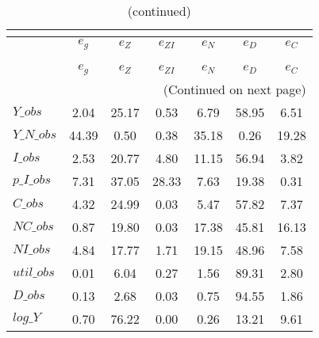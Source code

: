  
\begin{center}
\begin{longtable}{lcccccc} 
\caption{VARIANCE DECOMPOSITION (in percent)}\\
 \label{Table:th_var_decomp_uncond}\\
\toprule 
$           $	 & 	 $       {e_g}$	 & 	 $       {e_Z}$	 & 	 $    {e_{ZI}}$	 & 	 $       {e_N}$	 & 	 $       {e_D}$	 & 	 $       {e_C}$\\
\midrule \endfirsthead 
\caption{(continued)}\\
 \toprule \\ 
$           $	 & 	 $       {e_g}$	 & 	 $       {e_Z}$	 & 	 $    {e_{ZI}}$	 & 	 $       {e_N}$	 & 	 $       {e_D}$	 & 	 $       {e_C}$\\
\midrule \endhead 
\midrule \multicolumn{7}{r}{(Continued on next page)} \\ \bottomrule \endfoot 
\bottomrule \endlastfoot 
$Y\_obs     $	 & 	        2.04	 & 	       25.17	 & 	        0.53	 & 	        6.79	 & 	       58.95	 & 	        6.51 \\ 
$Y\_N\_obs  $	 & 	       44.39	 & 	        0.50	 & 	        0.38	 & 	       35.18	 & 	        0.26	 & 	       19.28 \\ 
$I\_obs     $	 & 	        2.53	 & 	       20.77	 & 	        4.80	 & 	       11.15	 & 	       56.94	 & 	        3.82 \\ 
$p\_I\_obs  $	 & 	        7.31	 & 	       37.05	 & 	       28.33	 & 	        7.63	 & 	       19.38	 & 	        0.31 \\ 
$C\_obs     $	 & 	        4.32	 & 	       24.99	 & 	        0.03	 & 	        5.47	 & 	       57.82	 & 	        7.37 \\ 
$NC\_obs    $	 & 	        0.87	 & 	       19.80	 & 	        0.03	 & 	       17.38	 & 	       45.81	 & 	       16.13 \\ 
$NI\_obs    $	 & 	        4.84	 & 	       17.77	 & 	        1.71	 & 	       19.15	 & 	       48.96	 & 	        7.58 \\ 
$util\_obs  $	 & 	        0.01	 & 	        6.04	 & 	        0.27	 & 	        1.56	 & 	       89.31	 & 	        2.80 \\ 
$D\_obs     $	 & 	        0.13	 & 	        2.68	 & 	        0.03	 & 	        0.75	 & 	       94.55	 & 	        1.86 \\ 
$log\_Y     $	 & 	        0.70	 & 	       76.22	 & 	        0.00	 & 	        0.26	 & 	       13.21	 & 	        9.61 \\ 

\end{longtable}
\end{center}
